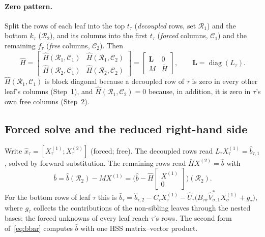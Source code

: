 \paragraph{Zero pattern.} Split the rows of each leaf into the top $t_\tau$ (\emph{decoupled} rows,
set $\mathcal R_1$) and the bottom $k_\tau$ ($\mathcal R_2$), and its columns into the first $t_\tau$
(\emph{forced} columns, $\mathcal C_1$) and the remaining $f_\tau$ (\emph{free} columns, $\mathcal C_2$).
Then
\begin{equation}\label{eq:blocktri}
\hat H=\begin{bmatrix}\hat H(\mathcal R_1,\mathcal C_1)&\hat H(\mathcal R_1,\mathcal C_2)\\ \hat H(\mathcal R_2,\mathcal C_1)&\hat H(\mathcal R_2,\mathcal C_2)\end{bmatrix}
=\begin{bmatrix}\mathbf L & 0\\ M & \bar H\end{bmatrix},\qquad \mathbf L=\operatorname{diag}(L_\tau).
\end{equation}
$\hat H(\mathcal R_1,\mathcal C_1)$ is block diagonal because a decoupled row of $\tau$ is zero in every other
leaf's columns (Step~1), and $\hat H(\mathcal R_1,\mathcal C_2)=0$ because, in addition, it is zero in $\tau$'s
own free columns (Step~2).

\subsection{Forced solve and the reduced right-hand side}\label{subsec:forcedsolve}
Write $\hat x_\tau=[X^{(1)}_\tau;X^{(2)}_\tau]$ (forced; free). The decoupled rows read
$L_\tau X_\tau^{(1)}=\hat b_{\tau,1}$, solved by forward substitution. The remaining rows read
$\bar H X^{(2)}=\bar b$ with
\begin{equation}\label{eq:bbar}
\bar b=\hat b(\mathcal R_2)-M X^{(1)}=\Big(\hat b-\hat H\begin{bmatrix}X^{(1)}\\0\end{bmatrix}\Big)(\mathcal R_2).
\end{equation}
For the bottom rows of leaf $\tau$ this is
$\bar b_\tau=\hat b_{\tau,2}-C_\tau X_\tau^{(1)}-\hat U_\tau\big(B_{\tau\sigma}\hat V_{\sigma,1}^*X_\sigma^{(1)}+g_\tau\big)$,
where $g_\tau$ collects the contributions of the non-sibling leaves through the nested bases: the forced
unknowns of every leaf reach $\tau$'s rows. The second form of~\eqref{eq:bbar} computes $\bar b$ with one
HSS matrix--vector product.

